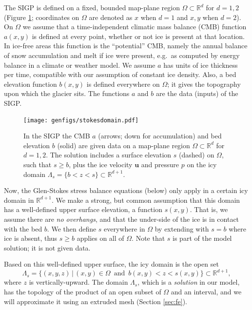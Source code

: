 \documentclass[letterpaper,final,12pt,reqno]{amsart}
\theoremstyle{claim}
\newcommand{\RR}{\mathbb{R}}
\newcommand{\bu}{\mathbf{u}}
\numberwithin{equation}{section}
\numberwithin{figure}{section}
\numberwithin{table}{section}
\numberwithin{theorem}{section}
\begin{document}
The SIGP is defined on a fixed, bounded map-plane region $\Omega \subset \RR^d$ for $d=1,2$ (Figure \ref{fig:stokesdomain}; coordinates on $\Omega$ are denoted as $x$ when $d=1$ and $x,y$ when $d=2$).  On $\Omega$ we assume that a time-independent climatic mass balance (CMB) \cite{Cogleyetal2011} function $a(x,y)$ is defined at every point, whether or not ice is present at that location.  In ice-free areas this function is the ``potential'' CMB, namely the annual balance of snow accumulation and melt if ice were present, e.g.~as computed by energy balance in a climate or weather model.  We assume $a$ has units of ice thickness per time, compatible with our assumption of constant ice density.  Also, a bed elevation function $b(x,y)$ is defined everywhere on $\Omega$; it gives the topography upon which the glacier sits.  The functions $a$ and $b$ are the data (inputs) of the SIGP.

\begin{figure}[t]
\begin{center}
\texttt{[image: genfigs/stokesdomain.pdf]}
\end{center}
\caption{In the SIGP the CMB $a$ (arrows; down for accumulation) and bed elevation $b$ (solid) are given data on a map-plane region $\Omega \subset \RR^d$ for $d=1,2$.  The solution includes a surface elevation $s$ (dashed) on $\Omega$, such that $s\ge b$, plus the ice velocity $\bu$ and pressure $p$ on the icy domain $\Lambda_s = \{b < z < s\} \subset \RR^{d+1}$.}
\label{fig:stokesdomain}
\end{figure}

Now, the Glen-Stokes stress balance equations (below) only apply in a certain icy domain in $\RR^{d+1}$.  We make a strong, but common \cite[for example]{IsaacStadlerGhattas2015,Jouvetetal2008,Lengetal2012,WirbelJarosch2020} assumption that this domain has a well-defined upper surface elevation, a function $s(x,y)$.  That is, we assume there are \emph{no overhangs}, and that the under-side of the ice is in contact with the bed $b$.  We then define $s$ everywhere in $\Omega$ by extending with $s=b$ where ice is absent, thus $s\ge b$ applies on all of $\Omega$.  Note that $s$ is part of the model solution; it is not given data.

Based on this well-defined upper surface, the icy domain is the open set
\begin{equation}
\Lambda_s = \{(x,y,z)\,|\,(x,y) \in \Omega \,\text{ and }\, b(x,y) < z < s(x,y)\}  \subset \RR^{d+1}, \label{eq:lambdas}
\end{equation}
where $z$ is vertically-upward.  The domain $\Lambda_s$, which is a \emph{solution} in our model, has the topology of the product of an open subset of $\Omega$ and an interval, and we will approximate it using an extruded mesh (Section \ref{sec:fe}).
\end{document}
